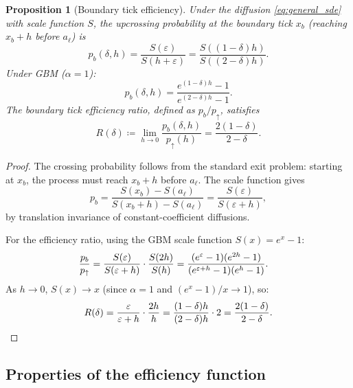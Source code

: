 \documentclass[11pt]{article}
\newtheorem{proposition}[theorem]{Proposition}
\theoremstyle{definition}
\theoremstyle{remark}
\begin{document}
\begin{proposition}[Boundary tick efficiency]\label{prop:boundary_eff}
Under the diffusion \eqref{eq:general_sde} with scale function $S$,
the upcrossing probability at the boundary tick $x_b$ (reaching
$x_b + h$ before $a_\ell$) is
\begin{equation}\label{eq:p_boundary}
p_b(\delta, h) = \frac{S(\varepsilon)}{S(h + \varepsilon)}
= \frac{S((1-\delta)h)}{S((2-\delta)h)}.
\end{equation}
Under GBM ($\alpha = 1$):
\begin{equation}\label{eq:p_boundary_gbm}
p_b(\delta, h) = \frac{e^{(1-\delta)h} - 1}{e^{(2-\delta)h} - 1}.
\end{equation}
The boundary tick efficiency ratio, defined as $p_b/p_\uparrow$, satisfies
\begin{equation}\label{eq:R_delta}
R(\delta) \coloneqq \lim_{h \to 0}\frac{p_b(\delta, h)}{p_\uparrow(h)}
= \frac{2(1-\delta)}{2-\delta}.
\end{equation}
\end{proposition}
\begin{proof}
The crossing probability follows from the standard exit problem:
starting at $x_b$, the process must reach $x_b + h$ before $a_\ell$.
The scale function gives
\[
p_b = \frac{S(x_b) - S(a_\ell)}{S(x_b + h) - S(a_\ell)}
= \frac{S(\varepsilon)}{S(\varepsilon + h)},
\]
by translation invariance of constant-coefficient diffusions.

For the efficiency ratio, using the GBM scale function
$S(x) = e^x - 1$:
\begin{align*}
\frac{p_b}{p_\uparrow}
&= \frac{S(\varepsilon)}{S(\varepsilon + h)}
\cdot \frac{S(2h)}{S(h)}
= \frac{(e^{\varepsilon} - 1)(e^{2h} - 1)}{%
(e^{\varepsilon + h} - 1)(e^h - 1)}.
\end{align*}
As $h \to 0$, $S(x) \to x$ (since $\alpha = 1$ and
$(e^x - 1)/x \to 1$), so:
\[
R(\delta) = \frac{\varepsilon}{\varepsilon + h}
\cdot \frac{2h}{h}
= \frac{(1-\delta)h}{(2-\delta)h} \cdot 2
= \frac{2(1-\delta)}{2-\delta}.
\qedhere
\]
\end{proof}

\subsection{Properties of the efficiency function}
\end{document}
